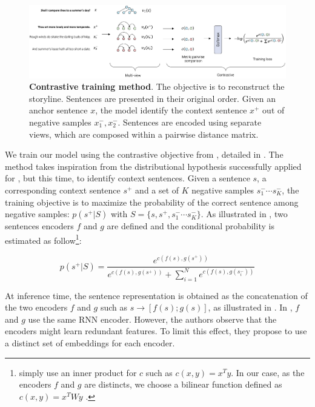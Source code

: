 \begin{figure}[!htb]
\begin{center}
\includegraphics[width=15cm]{images/contrastive-4.png}
\end{center}
\caption{\textbf{Contrastive training method}. The objective is to reconstruct the storyline. Sentences are presented in their original order. Given an anchor sentence $x$, the model  identify the context sentence $x^+$ out of negative samples $x_1^-, x_2^-$. Sentences are encoded using separate views, which are composed within a pairwise distance matrix. }
\end{figure}

We train our model using the contrastive objective from \textcite{logeswaran_18}, detailed in . The method takes inspiration from the distributional hypothesis successfully applied for , but this time, to identify context sentences. Given a sentence $s$, a corresponding context sentence $s^+$ and a set of $K$ negative samples $s^-_1 \cdots s^-_K$, the training objective is to maximize the probability of  the correct sentence among negative samples: $p(s^+ | S)$ with $S = \{s, s^+, s^-_1 \cdots s^-_K\}$. As illustrated in , two sentences encoders $f$ and $g$ are defined and the conditional probability is estimated as follow\footnote{\citet{logeswaran_18} simply use an inner product for $c$ such as $c\left(x, y\right) = x^Ty$. In our case, as the encoders $f$ and $g$ are distincts, we choose a bilinear function defined as $c\left(x, y\right) = x^TWy$ \cite{tschannen_20}.}:

\[
p(s^+ | S) = \frac{e^{c\left(f(s), g(s^+)\right)}}{e^{c\left(f(s), g(s^+)\right)}+\sum_{i=1}^Ne^{c\left(f(s), g(s^-_i)\right)}}
\]

At inference time, the sentence representation is obtained as the concatenation of the two encoders $f$ and $g$ such as $s \rightarrow [f(s);g(s)]$, as illustrated in . In \textcite{logeswaran_18}, $f$ and $g$ use the same RNN encoder. However, the authors observe that the encoders might learn redundant features. To limit this effect, they propose to use a distinct set of embeddings for each encoder. 

